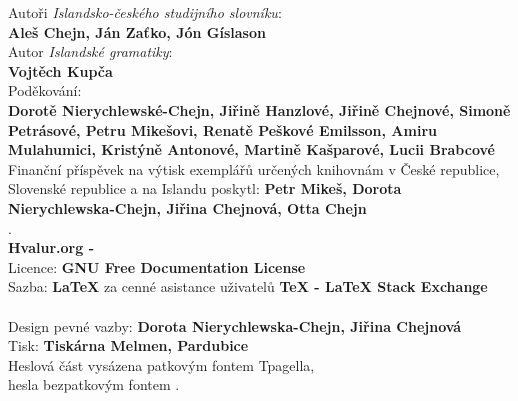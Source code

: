 
 \noindent   
Autoři \textit{Islandsko-českého studijního slovníku}: \\
\textbf{Aleš Chejn, Ján Zaťko, Jón Gíslason}\\

\noindent
Autor \textit{Islandské gramatiky}: \\
\textbf{Vojtěch Kupča}\\

\noindent
Poděkování: \\
\textbf{Dorotě Nierychlewské-Chejn, Jiřině Hanzlové, Jiřině Chejnové, Simoně Petrásové, Petru Mikešovi, Renatě Peškové Emilsson, Amiru Mulahumici, Kristýně Antonové, Martině Kašparové, Lucii Brabcové}\\

\noindent
Finanční příspěvek na výtisk exemplářů určených knihovnám v České republice, Slovenské republice a na Islandu poskytl: \textbf{Petr Mikeš, Dorota Nierychlewska-Chejn, Jiřina Chejnová, Otta Chejn} \\

{\color{white}.}\\[1cm]



\vfill
\noindent
\textbf{Hvalur.org - {\the\year}}\\
Licence: \textbf{GNU Free Documentation License} \\
Sazba: \textbf{{\LaTeX}} za cenné asistance uživatelů \textbf{{\TeX} - {\LaTeX} Stack Exchange} \\ [1cm]

\textbf{\ISBN} \\ [1cm]
\noindent
Design pevné vazby: \textbf{Dorota Nierychlewska-Chejn, Jiřina Chejnová}\\
Tisk: \textbf{Tiskárna Melmen, Pardubice}\\
\noindent
Heslová část vysázena patkovým fontem Tpagella,\\
hesla bezpatkovým fontem {\selectfont{Helvetica}}.\\


